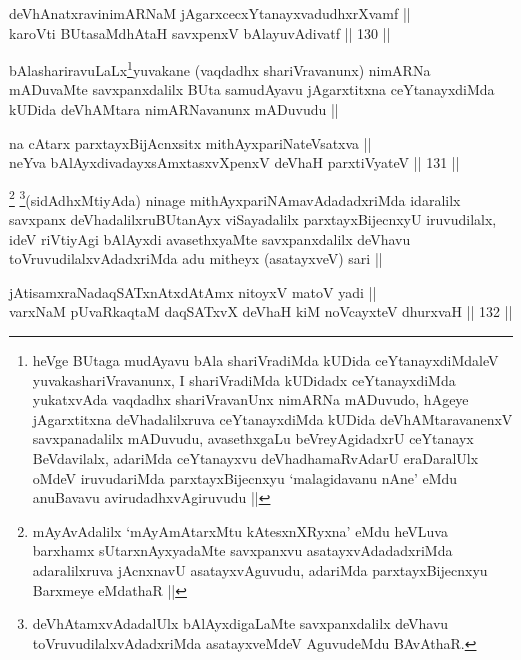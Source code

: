 \begin{shl}
deVhAnatxravinimARNaM jAgarxcecxYtanayxvadudhxrXvamf || \\
karoVti BUtasaMdhAtaH savxpenxV bAlayuvAdivatf ||  130 ||  
\end{shl}

\begin{artha}
bAlashariravuLaLx\footnote{heVge BUtaga mudAyavu bAla shariVradiMda kUDida ceYtanayxdiMdaleV yuvakashariVravanunx, I shariVradiMda kUDidadx ceYtanayxdiMda yukatxvAda vaqdadhx shariVravanUnx nimARNa mADuvudo, hAgeye jAgarxtitxna deVhadalilxruva ceYtanayxdiMda kUDida deVhAMtaravanenxV savxpanadalilx mADuvudu, avasethxgaLu beVreyAgidadxrU ceYtanayx BeVdavilalx, adariMda ceYtanayxvu deVhadhamaRvAdarU eraDaralUlx oMdeV iruvudariMda parxtayxBijecnxyu `malagidavanu nAne' eMdu anuBavavu avirudadhxvAgiruvudu ||}yuvakane (vaqdadhx shariVravanunx) nimARNa mADuvaMte savxpanxdalilx BUta samudAyavu jAgarxtitxna ceYtanayxdiMda kUDida deVhAMtara nimARNavanunx mADuvudu ||
\end{artha}

\begin{shl}
na cAtarx parxtayxBijAcnx\s sitx mithAyxpariNateVsatxva || \\
neYva bAlAyxdivadayxsAmxtasxvXpenxV deVhaH parxtiVyateV ||  131 ||  
\end{shl}

\begin{artha}
\footnote{mAyAvAdalilx `mAyAmAtarxMtu kAtesxnXRyxna' eMdu heVLuva barxhamx sUtarxnAyxyadaMte savxpanxvu asatayxvAdadadxriMda adaralilxruva jAcnxnavU asatayxvAguvudu, adariMda parxtayxBijecnxyu Barxmeye eMdathaR ||}
\footnote{deVhAtamxvAdadalUlx bAlAyxdigaLaMte savxpanxdalilx deVhavu toVruvudilalxvAdadxriMda asatayxveMdeV AguvudeMdu BAvAthaR.}(sidAdhxMtiyAda) ninage mithAyxpariNAmavAdadadxriMda idaralilx savxpanx deVhadalilxruBUtanAyx viSayadalilx parxtayxBijecnxyU iruvudilalx, ideV riVtiyAgi bAlAyxdi avasethxyaMte savxpanxdalilx deVhavu toVruvudilalxvAdadxriMda adu mitheyx (asatayxveV) sari || 
\end{artha}


\begin{shl}
jAtisamxraNadaqSATxnAtxdAtAmx nitoyxV matoV yadi ||  \\
varxNaM pUvaRkaqtaM daqSATxvX deVhaH kiM noVcayxteV dhurxvaH ||  132 ||  
\end{shl}

